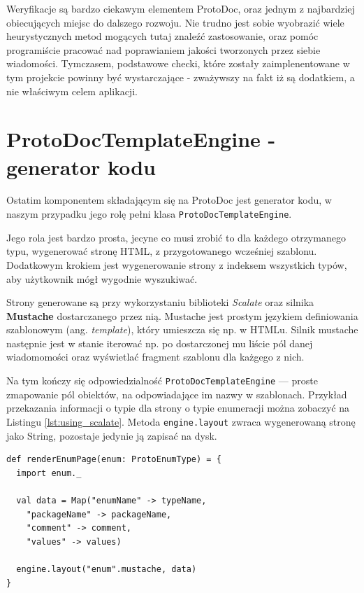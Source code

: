 \documentclass[pdflatex,11pt]{aghdpl}
\begin{document}
Weryfikacje są bardzo ciekawym elementem ProtoDoc, oraz jednym z najbardziej obiecujących miejsc do dalszego rozwoju.
Nie trudno jest sobie wyobrazić wiele heurystycznych metod mogących tutaj znaleźć zastosowanie, oraz pomóc programiście
pracować nad poprawianiem jakości tworzonych przez siebie wiadomości. Tymczasem, podstawowe checki, które zostały
zaimplenentowane w tym projekcie powinny być wystarczające - zważywszy na fakt iż są dodatkiem, a nie właściwym celem aplikacji.

\section{ProtoDocTemplateEngine - generator kodu}
Ostatim komponentem składającym się na ProtoDoc jest generator kodu, w naszym przypadku jego rolę pełni klasa \verb|ProtoDocTemplateEngine|.

Jego rola jest bardzo prosta, jecyne co musi zrobić to dla każdego otrzymanego typu, wygenerować stronę HTML, z przygotowanego wcześniej szablonu.
Dodatkowym krokiem jest wygenerowanie strony z indeksem wszystkich typów, aby użytkownik mógł wygodnie wyszukiwać.

Strony generowane są przy wykorzystaniu biblioteki \textit{Scalate} \cite{Scalate}
oraz silnika \textbf{Mustache} dostarczanego przez nią. Mustache jest prostym językiem definiowania szablonowym (ang. \textit{template}), który umieszcza 
się np. w HTMLu. Silnik mustache następnie jest w stanie iterować np. po dostarczonej mu liście pól danej wiadomomości oraz wyświetlać fragment szablonu dla każgego z nich.

Na tym kończy się odpowiedzialność \verb|ProtoDocTemplateEngine| --- proste zmapowanie pól obiektów, na odpowiadające im nazwy w szablonach.
Przykład przekazania informacji o typie dla strony o typie enumeracji można zobaczyć na Listingu \ref{lst:using_scalate}. Metoda \verb|engine.layout|
zwraca wygenerowaną stronę jako String, pozostaje jedynie ją zapisać na dysk.

\newpage
\begin{lstlisting}[caption={Przykład zastosowania Scalate (z silnikiem renderowania szablonów Mustache)}, label={lst:using_scalate}]
def renderEnumPage(enum: ProtoEnumType) = {
  import enum._

  val data = Map("enumName" -> typeName,
    "packageName" -> packageName,
    "comment" -> comment,
    "values" -> values)

  engine.layout("enum".mustache, data)
}
\end{lstlisting}
\end{document}
